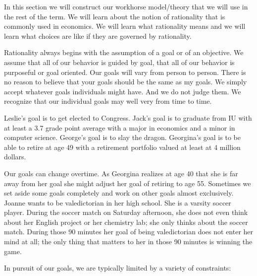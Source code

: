 \documentclass[
]{book}
\begin{document}
In this section we will construct our workhorse model/theory that we will use in the rest of the term. We will learn about the notion of rationality that is commonly used in economics. We will learn what rationality means and we will learn what choices are like if they are governed by rationality.

Rationality always begins with the assumption of a goal or of an objective. We assume that all of our behavior is guided by goal, that all of our behavior is purposeful or goal oriented. Our goals will vary from person to person. There is no reason to believe that your goals should be the same as my goals. We simply accept whatever goals individuals might have. And we do not judge them. We recognize that our individual goals may well very from time to time.

Leslie's goal is to get elected to Congress. Jack's goal is to graduate from IU with at least a 3.7 grade point average with a major in economics and a minor in computer science. George's goal is to slay the dragon. Georgina's goal is to be able to retire at age 49 with a retirement portfolio valued at least at 4 million dollars.

Our goals can change overtime. As Georgina realizes at age 40 that she is far away from her goal she might adjust her goal of retiring to age 55. Sometimes we set aside some goals completely and work on other goals almost exclusively. Joanne wants to be valedictorian in her high school. She is a varsity soccer player. During the soccer match on Saturday afternoon, she does not even think about her English project or her chemistry lab; she only thinks about the soccer match. During those 90 minutes her goal of being valedictorian does not enter her mind at all; the only thing that matters to her in those 90 minutes is winning the game.

In pursuit of our goals, we are typically limited by a variety of constraints:
\end{document}
